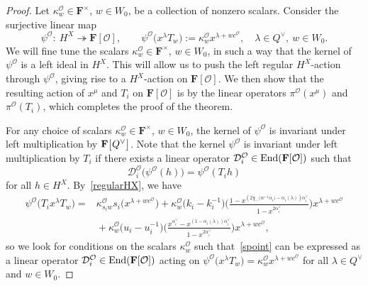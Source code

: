 \begin{proof}
Let $\kappa_w^\mathcal{O}\in\mathbf{F}^\times$, $w\in W_0$, be a collection of nonzero scalars.
Consider the surjective linear map
\begin{equation}\label{psicmap}
\psi^\mathcal{O}\colon\ H^X\twoheadrightarrow \mathbf{F}[\mathcal{O}],\qquad \psi^\mathcal{O}\bigl(x^\lambda T_w\bigr):=\kappa_w^\mathcal{O}x^{\lambda+wc^{\mathcal{O}}},\quad \lambda\in Q^\vee,\ w\in W_0.
\end{equation}
We will fine tune the scalars $\kappa_w^\mathcal{O}\in\mathbf{F}^\times$, $w\in W_0$, in such a way that the kernel of $\psi^\mathcal{O}$
is a left ideal in $H^X$. This will allow us to push the left regular $H^X$-action through $\psi^\mathcal{O}$, giving rise to a
$H^X$-action on $\mathbf{F}[\mathcal{O}]$. We then show that the resulting action of $x^\mu$ and $T_i$ on $\mathbf{F}[\mathcal{O}]$ is by the linear operators $\pi^\mathcal{O}(x^\mu)$ and $\pi^\mathcal{O}(T_i)$, which completes the proof of the theorem.

For any choice of scalars $\kappa_w^\mathcal{O}\in\mathbf{F}^\times$, $w\in W_0$, the kernel of $\psi^\mathcal{O}$ is invariant under left multiplication by $\mathbf{F}\smash{\bigl[Q^\vee\bigr]}$.
Note that the kernel $\psi^\mathcal{O}$ is invariant under left multiplication by $T_i$ if there exists a linear operator $\mathcal{D}_i^\mathcal{O}\in\textup{End}(\mathbf{F}[\mathcal{O}])$ such that
\begin{equation*}%
\mathcal{D}_i^\mathcal{O}\bigl(\psi^\mathcal{O}(h)\bigr)=\psi^\mathcal{O}(T_ih)
\end{equation*}
for all $h\in H^X$.
By~\eqref{regularHX}, we have
\begin{align}
\psi^\mathcal{O}\bigl(T_ix^\lambda T_w\bigr)={}&\kappa_{s_iw}^\mathcal{O}s_i\bigl(x^{\lambda+wc^{\mathcal{O}}}\bigr)
+ \kappa_w^\mathcal{O}\bigl(k_i-k_i^{-1}\bigr)\Biggl(\frac{1-x^{(2\chi_-\bigl(w^{-1}\alpha_i\bigr)-\alpha_i(\lambda))\alpha_i^\vee}}{1-x^{2\alpha_i^\vee}}\Biggr)x^{\lambda+wc^{\mathcal{O}}}\nonumber\\
&{}+
\kappa_w^\mathcal{O}\bigl(u_i-u_i^{-1}\bigr)\Biggl(\frac{x^{\alpha_i^\vee}-x^{(1-\alpha_i(\lambda))\alpha_i^\vee}}{1-x^{2\alpha_i^\vee}}\Biggr)x^{\lambda+wc^{\mathcal{O}}},
\label{spoint}
\end{align}
so we look for conditions on the scalars $\kappa_w^\mathcal{O}$ such that~\eqref{spoint} can be expressed as
a linear operator $\mathcal{D}_i^\mathcal{O}\in\textup{End}(\mathbf{F}[\mathcal{O}])$ acting on $\psi^\mathcal{O}\bigl(x^\lambda T_w\bigr)=\kappa_w^\mathcal{O}x^{\lambda+wc^\mathcal{O}}$ for all $\lambda\in Q^\vee$ and $w\in W_0$.


\end{proof}
